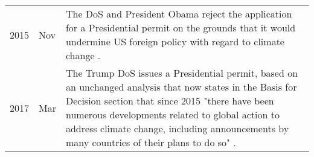 \begin{table}[H]
\begin{tabularx}{\textwidth}{r @{\hspace{0.5\tabcolsep}} l |@{\timeline} X}
		2015 & Nov & The DoS and President Obama reject the application for a Presidential permit on the grounds that it would undermine US foreign policy with regard to climate change \citep{DoS2015,WhiteHouse2015}.\\

		2017 & Mar & The Trump DoS issues a Presidential permit, based on an unchanged analysis that now states in the Basis for Decision section that since 2015 "there have been numerous developments related to global action to address climate change, including announcements by many countries of their plans to do so" \citep[p. 29]{DoS2017}. 

	\end{tabularx}
\parnotes
\end{table}

